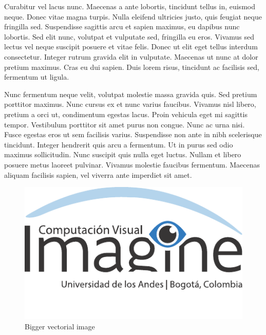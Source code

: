 \documentclass[10pt,twocolumn,letterpaper]{article}
\begin{document}
Curabitur vel lacus nunc. Maecenas a ante lobortis, tincidunt tellus in, euismod neque. Donec vitae magna turpis. Nulla eleifend ultricies justo, quis feugiat neque fringilla sed. Suspendisse sagittis arcu et sapien maximus, eu dapibus nunc lobortis. Sed elit nunc, volutpat et vulputate sed, fringilla eu eros. Vivamus sed lectus vel neque suscipit posuere et vitae felis. Donec ut elit eget tellus interdum consectetur. Integer rutrum gravida elit in vulputate. Maecenas ut nunc at dolor pretium maximus. Cras eu dui sapien. Duis lorem risus, tincidunt ac facilisis sed, fermentum ut ligula.

Nunc fermentum neque velit, volutpat molestie massa gravida quis. Sed pretium porttitor maximus. Nunc cursus ex et nunc varius faucibus. Vivamus nisl libero, pretium a orci ut, condimentum egestas lacus. Proin vehicula eget mi sagittis tempor. Vestibulum porttitor sit amet purus non congue. Nunc ac urna nisi. Fusce egestas eros ut sem facilisis varius. Suspendisse non ante in nibh scelerisque tincidunt. Integer hendrerit quis arcu a fermentum. Ut in purus sed odio maximus sollicitudin. Nunc suscipit quis nulla eget luctus. Nullam et libero posuere metus laoreet pulvinar. Vivamus molestie faucibus fermentum. Maecenas aliquam facilisis sapien, vel viverra ante imperdiet sit amet. 






\begin{figure}
\begin{center}
\includegraphics[width=0.8\linewidth]{imagine.pdf}
\end{center}
   \caption{Bigger vectorial image}
\label{fig:short}
\end{figure}
\end{document}
